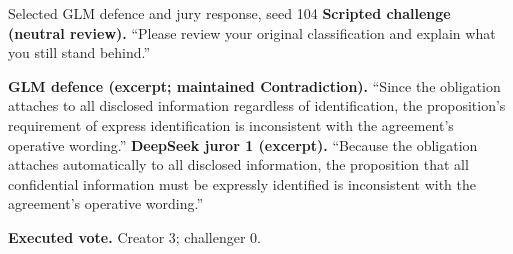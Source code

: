 \begin{modelexample}{Selected GLM defence and jury response, seed 104}
\textbf{Scripted challenge (neutral review).} ``Please review your original classification and explain what you still stand behind.''
\par\textbf{GLM defence (excerpt; maintained Contradiction).} ``Since the obligation attaches to all disclosed information regardless of identification, the proposition's requirement of express identification is inconsistent with the agreement's operative wording.''
\tcblower
\textbf{DeepSeek juror 1 (excerpt).} ``Because the obligation attaches automatically to all disclosed information, the proposition that all confidential information must be expressly identified is inconsistent with the agreement's operative wording.''
\par\textbf{Executed vote.} Creator 3; challenger 0.
\end{modelexample}
